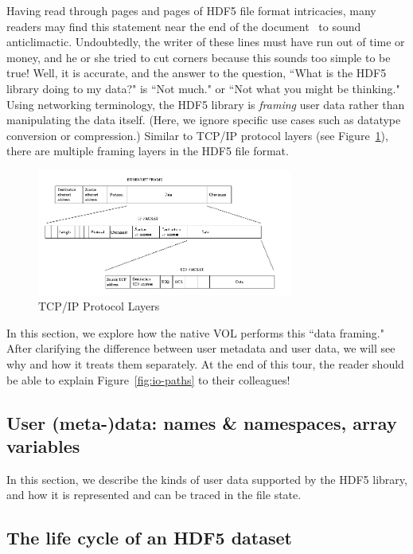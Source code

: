Having read through pages and pages of HDF5 file format intricacies, many readers may find this statement near the end of the document~\cite{ffmt} to sound anticlimactic. Undoubtedly, the writer of these lines must have run out of time or money, and he or she tried to cut corners because this sounds too simple to be true! Well, it is accurate, and the answer to the question, ``What is the HDF5 library doing to my data?" is ``Not much." or ``Not what you might be thinking." Using networking terminology, the HDF5 library is \textit{framing} user data rather than manipulating the data itself. (Here, we ignore specific use cases such as datatype conversion or compression.) Similar to TCP/IP protocol layers (see Figure~\ref{fig:tcpip-protocols}), there are multiple framing layers in the HDF5 file format.

\begin{figure}[h]
    \centering
    \includegraphics[width=0.75\textwidth]{images/protocols.png}
    \caption{TCP/IP Protocol Layers\cite{tldp2023}}
    \label{fig:tcpip-protocols}
\end{figure}

In this section, we explore how the native VOL performs this ``data framing." After clarifying the difference between user metadata and user data, we will see why and how it treats them separately. At the end of this tour, the reader should be able to explain Figure~\ref{fig:io-paths} to their colleagues!

\subsection{User (meta-)data: names \& namespaces, array variables}

In this section, we describe the kinds of user data supported by the HDF5 library, and how it is represented and can be traced in the file state.

\subsection{The life cycle of an HDF5 dataset}

